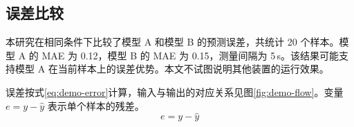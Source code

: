 \subsection{误差比较}
本研究在相同条件下比较了模型 A 和模型 B 的预测误差，共统计 20 个样本。模型 A 的 MAE 为 0.12，模型 B 的 MAE 为 0.15，测量间隔为 5\,s。该结果可能支持模型 A 在当前样本上的误差优势\cite{demo2026a,demo2026b}。本文不试图说明其他装置的运行效果。

误差按式\eqref{eq:demo-error}计算，输入与输出的对应关系见图\ref{fig:demo-flow}。变量 $e=y-\hat{y}$ 表示单个样本的残差。
\begin{equation}
e=y-\hat{y}
\label{eq:demo-error}
\end{equation}

